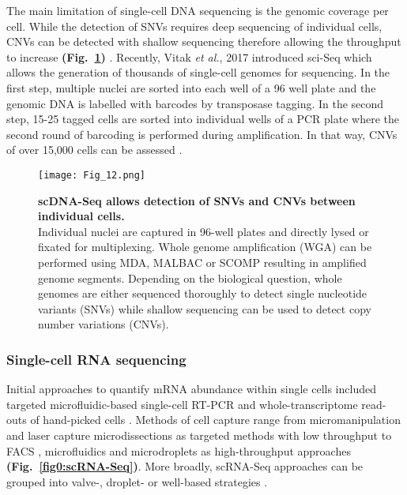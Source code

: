 The main limitation of single-cell DNA sequencing is the genomic coverage per cell. While the detection of SNVs requires deep sequencing of individual cells, CNVs can be detected with shallow sequencing therefore allowing the throughput to increase \textbf{(Fig.~\ref{fig0:scDNA-Seq})} \citep{Knouse2016, Baslan2015}. Recently, Vitak \emph{et al.}, 2017 introduced \gls{sci-Seq} which allows the generation of thousands of single-cell genomes for sequencing. In the first step, multiple nuclei are sorted into each well of a 96 well plate and the genomic DNA is labelled with barcodes by transposase tagging. In the second step, 15-25 tagged cells are sorted into individual wells of a PCR plate where the second round of barcoding is performed during amplification. In that way, CNVs of over 15,000 cells can be assessed \citep{Vitak2017}.

\begin{figure}[!h]
\centering
\texttt{[image: Fig\_12.png]}
\caption[\Gls{scDNA-Seq} allows detection of SNVs and CNVs between individual cells]{\textbf{\Gls{scDNA-Seq} allows detection of SNVs and CNVs between individual cells.}\\
Individual nuclei are captured in 96-well plates and directly lysed or fixated for multiplexing. Whole genome amplification (WGA) can be performed using MDA, MALBAC or SCOMP resulting in amplified genome segments. Depending on the biological question, whole genomes are either sequenced thoroughly to detect single nucleotide variants (SNVs) while shallow sequencing can be used to detect copy number variations (CNVs).}
\label{fig0:scDNA-Seq}
\end{figure}

\vspace{-5mm}

\subsubsection{Single-cell RNA sequencing}

Initial approaches to quantify mRNA abundance within single cells included targeted microfluidic-based single-cell \gls{RT-PCR} \citep{Warren2006} and whole-transcriptome read-outs of hand-picked cells \citep{Tang2009}. Methods of cell capture range from micromanipulation \citep{Grindberg2014} and laser capture microdissections \citep{Frumkin2008} as targeted methods with low throughput to  \gls{FACS} \citep{Hayashi2010, Dalerba2011, Jaitin2014}, microfluidics \citep{Trapnell2014, Treutlein2014} and microdroplets \citep{Klein2015, Macosko2015} as high-throughput approaches \textbf{(Fig.~\ref{fig0:scRNA-Seq})}. More broadly, \gls{scRNA-Seq} approaches can be grouped into valve-, droplet- or well-based strategies \citep{Prakadan2017}. \\

